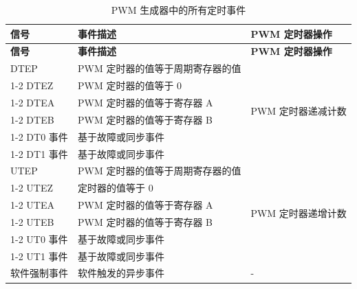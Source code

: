 \begin{longtable}{ |p{3cm}|p{7cm}|p{5cm}|}
    \caption{ PWM 生成器中的所有定时事件}
    \label{tab:mcpwm-gen-in}
    \\\hline
    \rowcolor{lightgray}
   \textbf{信号} & \textbf{事件描述} & \textbf{PWM 定时器操作} \\\hline
    \endfirsthead
    \hline
    \rowcolor{lightgray}   
    \textbf{信号} & \textbf{事件描述} & \textbf{PWM 定时器操作}  \\\hline
    \endhead
    \hline
    \endfoot
    DTEP 
    & PWM 定时器的值等于周期寄存器的值
    & \multirow{6}{*}{PWM 定时器递减计数}
    \\
    \cline{1-2}
    DTEZ
    & PWM 定时器的值等于 0
    & 
    \\
    \cline{1-2}
    DTEA
    & PWM 定时器的值等于寄存器 A
    & 
    \\
    \cline{1-2}
    DTEB
    & PWM 定时器的值等于寄存器 B
    & 
    \\
    \cline{1-2}
    DT0 事件
    & 基于故障或同步事件
    & 
    \\
    \cline{1-2}
    DT1 事件
    & 基于故障或同步事件
    & 
    \\\hline
    UTEP
    & PWM 定时器的值等于周期寄存器的值
    & \multirow{6}{*}{PWM 定时器递增计数}
    \\
    \cline{1-2}
    UTEZ
    & 定时器的值等于 0
    & 
    \\
    \cline{1-2}
    UTEA
    & PWM 定时器的值等于寄存器 A
    & 
    \\
    \cline{1-2}
    UTEB
    & PWM 定时器的值等于寄存器 B
    & 
    \\
    \cline{1-2}
    UT0 事件
    & 基于故障或同步事件
    & 
    \\
    \cline{1-2}
    UT1 事件
    & 基于故障或同步事件
    & 
    \\\hline
    软件强制事件
    & 软件触发的异步事件
    & -
\end{longtable}
